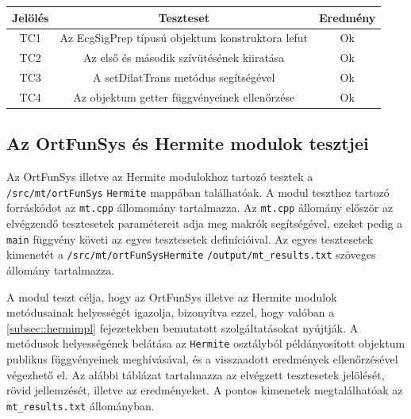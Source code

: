\documentclass[oneside,titlepage,12pt,a4paper]{report}
\begin{document}
\begin{center}
\begin{adjustbox}{width=1\textwidth}
 \begin{tabular}{||c c c||} 
 \hline
 Jelölés & Teszteset & Eredmény \\ [0.5ex] 
 \hline\hline
 TC1 & Az EcgSigPrep típusú objektum konstruktora lefut &  Ok \\ 
 \hline
 TC2 & Az első és második szívütésének kiiratása &  Ok \\
 \hline
 TC3 & A setDilatTrans metódus segítségével & Ok \\
 \hline
 TC4 & Az objektum getter függvényeinek ellenőrzése & Ok  \\
 \hline
\end{tabular}
\end{adjustbox}
\end{center}


\subsection{Az OrtFunSys és Hermite modulok tesztjei}

Az OrtFunSys illetve az Hermite modulokhoz tartozó tesztek a \texttt{/src/mt/ortFunSys} \linebreak \texttt{Hermite} mappában találhatóak. A modul teszthez tartozó forráskódot az \texttt{mt.cpp} állomomány tartalmazza. Az \texttt{mt.cpp} állomány először az elvégzendő tesztesetek paramétereit adja meg makrók segítségével, ezeket pedig a \texttt{main} függvény követi az egyes \linebreak  tesztesetek definícióival. Az egyes tesztesetek kimenetét a \texttt{/src/mt/ortFunSysHermite} \linebreak  \texttt{/output/mt\_results.txt} szöveges állomány tartalmazza. 
\par A modul teszt célja, hogy az OrtFunSys illetve az Hermite modulok metódusainak helyességét igazolja, bizonyítva ezzel, hogy valóban a \ref{subsec::hermimpl} fejezetekben bemutatott szolgáltatásokat nyújtják. A metódusok helyességének belátása az \texttt{Hermite} osztályból példányosított objektum publikus függvényeinek meghívásával, és a visszaadott eredmények ellenőrzésével végezhető el. Az alábbi táblázat tartalmazza az elvégzett tesztesetek jelölését, rövid jellemzését, illetve az eredményeket. A pontos kimenetek megtalálhatóak az \texttt{mt\_results.txt} állományban. 
\end{document}
